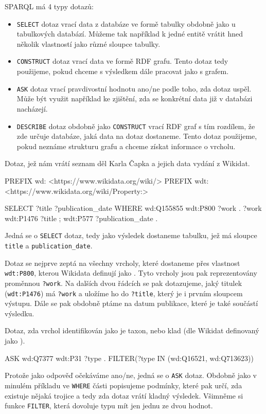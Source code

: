 SPARQL má 4 typy dotazů:
\begin{itemize}
    \item \texttt{SELECT} dotaz vrací data z databáze ve formě tabulky obdobně jako u tabulkových databází. Můžeme tak například k jedné entitě vrátit hned několik vlastností jako různé sloupce tabulky.
    \item \texttt{CONSTRUCT} dotaz vrací data ve formě RDF grafu. Tento dotaz tedy použijeme, pokud chceme s výsledkem dále pracovat jako s grafem.
    \item \texttt{ASK} dotaz vrací pravdivostní hodnotu ano/ne podle toho, zda dotaz uspěl. Může být využit například ke zjištění, zda se konkrétní data již v databázi nacházejí.
    \item \texttt{DESCRIBE} dotaz obdobně jako \texttt{CONSTRUCT} vrací RDF graf s tím rozdílem, že zde určuje databáze, jaká data na dotaz dostaneme. Tento dotaz použijeme, pokud neznáme strukturu grafu a chceme získat  informace o vrcholu.
\end{itemize}

\newpage

\begin{prikl}
Dotaz, jež nám vrátí seznam děl Karla Čapka a jejich data vydání z Wikidat.
\begin{code}
PREFIX wd: <https://www.wikidata.org/wiki/>
PREFIX wdt: <https://www.wikidata.org/wiki/Property:>

SELECT ?title ?publication_date
WHERE
{
    wd:Q155855 wdt:P800 ?work .
    ?work wdt:P1476 ?title ;
          wdt:P577 ?publication_date .
}
\end{code}
Jedná se o \texttt{SELECT} dotaz, tedy jako výsledek dostaneme tabulku, jež má sloupce \texttt{title} a \texttt{publication_date}.

Dotaz se nejprve zeptá na všechny vrcholy, které dostaneme přes vlastnost \texttt{wdt:P800}, kterou Wikidata definují jako . Tyto vrcholy jsou pak reprezentovány proměnnou \texttt{?work}. Na dalších dvou řádcích se pak dotazujeme, jaký titulek (\texttt{wdt:P1476}) má \texttt{?work} a uložíme ho do \texttt{?title}, který je i prvním sloupcem výstupu. Dále se pak obdobně ptáme na datum publikace, které je také součástí výsledku.
\end{prikl}

\begin{prikl}
Dotaz, zda vrchol identifikován jako  je taxon, nebo klad (dle Wikidat definovaný jako ).
\begin{code}
ASK {
  wd:Q7377 wdt:P31 ?type .
  FILTER(?type IN (wd:Q16521, wd:Q713623))
}
\end{code}
Protože jako odpověď očekáváme ano/ne, jedná se o \texttt{ASK} dotaz. Obdobně jako v minulém příkladu ve \texttt{WHERE} části popisujeme podmínky, které pak určí, zda existuje nějaká trojice a tedy zda dotaz vrátí kladný výsledek. Všimněme si funkce \texttt{FILTER}, která dovoluje typu mít jen jednu ze dvou hodnot.
\end{prikl}

